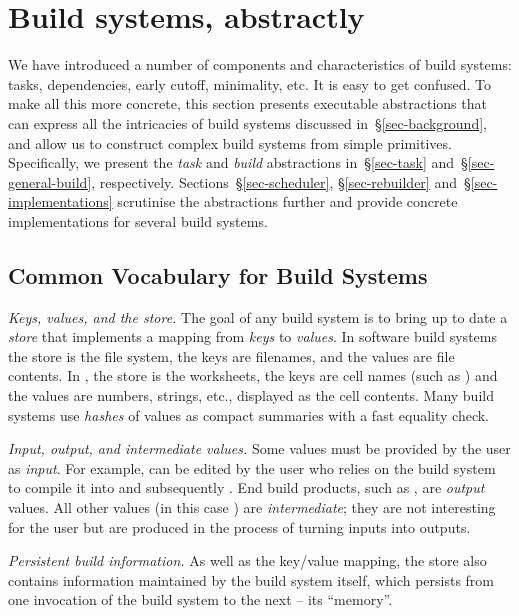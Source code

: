 \section{Build systems, abstractly}\label{sec-abstractions}

We have introduced a number of components and
characteristics of build systems:
tasks, dependencies, early cutoff, minimality, etc.
It is easy to get confused.
To make all this more concrete, this section presents executable
abstractions that can express
all the intricacies of build systems discussed in~\S\ref{sec-background},
and allow us to construct complex build systems from simple primitives. Specifically, we
present the \emph{task} and \emph{build} abstractions in~\S\ref{sec-task}
and~\S\ref{sec-general-build}, respectively. Sections~\S\ref{sec-scheduler},
\S\ref{sec-rebuilder} and~\S\ref{sec-implementations} scrutinise the
abstractions further and provide concrete implementations for several build
systems.

\subsection{Common Vocabulary for Build Systems}\label{sec-vocabulary}

\emph{Keys, values, and the store.} The goal of any build system is to
bring up to date a \emph{store} that implements a mapping from \emph{keys} to
\emph{values}. In software build systems the store is the file system, the
keys are filenames, and the values are file contents. In \Excel, the store is
the worksheets, the keys are cell names (such as ) and the values are
numbers, strings, etc., displayed as the cell contents. Many build systems use
\emph{hashes} of values as compact summaries with a fast equality check.

\emph{Input, output, and intermediate values.} Some values must be provided by
the user as \emph{input}. For example,  can be edited by the user
who relies on the build system to compile it into  and subsequently
. End build products, such as , are \emph{output}
values. All other values (in this case ) are \emph{intermediate};
they are not interesting for the user but are produced in the process of turning
inputs into outputs.

\emph{Persistent build information.} As well as the key/value mapping, the
store also contains information maintained by the build system itself, which
persists from one invocation of the build system to the next -- its ``memory''.

